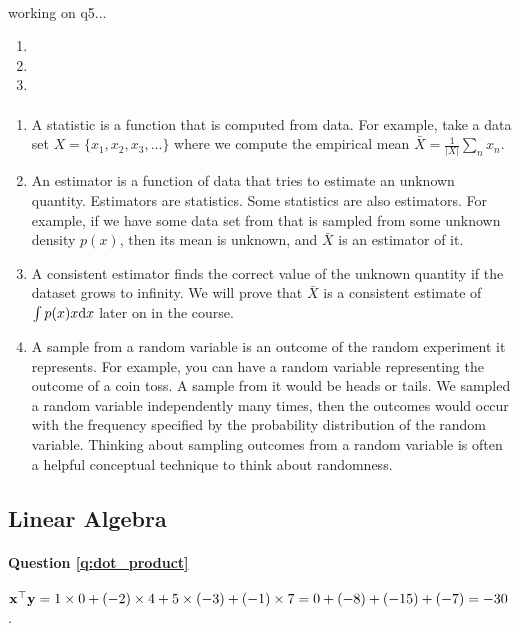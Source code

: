 \paragraph{}

working on q5...

\begin{enumerate}[label=\alph*.]
\item
\item
\item
\end{enumerate}

\paragraph{}
\begin{enumerate}[label=\alph*.]
\item A statistic is a function that is computed from data. For example, take a data set $X = \{x_1, x_2, x_3, \dots\}$ where we compute the empirical mean $\bar X = \frac{1}{|X|}\sum_n x_n$.
\item An estimator is a function of data that tries to estimate an unknown quantity. Estimators are statistics. Some statistics are also estimators. For example, if we have some data set from that is sampled from some unknown density $p(x)$, then its mean is unknown, and $\bar X$ is an estimator of it.
\item A consistent estimator finds the correct value of the unknown quantity if the dataset grows to infinity. We will prove that $\bar X$ is a consistent estimate of $\int p(x) x \mathrm{d} x$ later on in the course.
\item A sample from a random variable is an outcome of the random experiment it represents. For example, you can have a random variable representing the outcome of a coin toss. A sample from it would be heads or tails. We sampled a random variable independently many times, then the outcomes would occur with the frequency specified by the probability distribution of the random variable. Thinking about sampling outcomes from a random variable is often a helpful conceptual technique to think about randomness.
\end{enumerate}

\subsection{Linear Algebra}

\paragraph{Question \ref{q:dot_product}}
$\mathbf{x}^\top \mathbf{y} = 1 \times 0 + (-2) \times 4 + 5 \times (-3) + (-1) \times 7 = 0 + (-8) + (-15) + (-7) = -30$.

